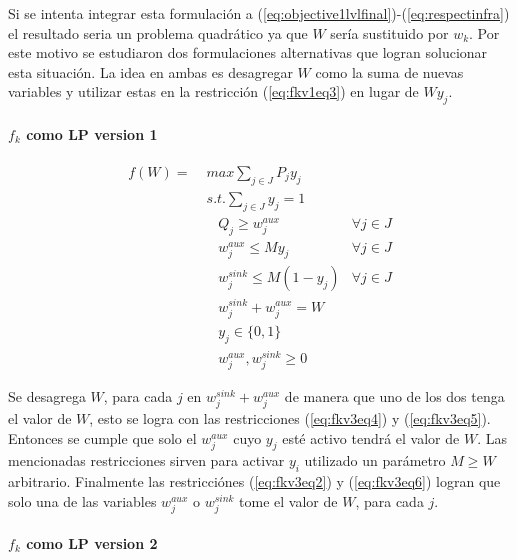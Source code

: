 \documentclass{article}
\begin{document}
  Si se intenta integrar esta formulación a (\ref{eq:objective1lvlfinal})-(\ref{eq:respectinfra}) el resultado seria un problema quadrático ya que $W$ sería sustituido por $w_k$. Por este motivo se estudiaron dos formulaciones alternativas que logran solucionar esta situación. La idea en ambas es desagregar $W$ como la suma de nuevas variables y utilizar estas en la restricción (\ref{eq:fkv1eq3}) en lugar de $W y_j$.

  \paragraph*{$f_k$ como LP version 1}

  \begin{align}
    f(W) =\; & max \sum_{j \in J} P_j y_j             & \label{eq:fkv3eq1}\\
             & s.t. \sum_{j \in J} y_j = 1            & \label{eq:fkv3eq2}\\
             & \;\;\; Q_j \geq w^{aux}_j              & \forall j \in J \label{eq:fkv3eq3} \\
             & \;\;\; w^{aux}_j \leq M y_j            & \forall j \in J \label{eq:fkv3eq4} \\
             & \;\;\; w^{sink}_j \leq M (1 - y_j)     & \forall j \in J \label{eq:fkv3eq5} \\
             & \;\;\; w^{sink}_j + w^{aux}_j = W      & \label{eq:fkv3eq6} \\
             & \;\;\; y_j \in \{0,1\}                 & \label{eq:fkv3domainy} \\
             & \;\;\; w^{aux}_j, w^{sink}_j \geq 0    & \label{eq:fkv3eq7}
  \end{align}

  Se desagrega $W$, para cada $j$ en $w^{sink}_j + w^{aux}_j$ de manera que uno de los dos tenga el valor de $W$, esto se logra con las restricciones (\ref{eq:fkv3eq4}) y (\ref{eq:fkv3eq5}). Entonces se cumple que solo el $w^{aux}_j$ cuyo $y_j$ esté activo tendrá el valor de $W$. Las mencionadas restricciones sirven para activar $y_i$ utilizado un parámetro $M \geq W$ arbitrario. Finalmente las restricciónes (\ref{eq:fkv3eq2}) y (\ref{eq:fkv3eq6}) logran que solo una de las variables $w^{aux}_j$ o $w^{sink}_j$ tome el valor de $W$, para cada $j$.

  \paragraph*{$f_k$ como LP version 2}
\end{document}
